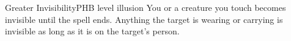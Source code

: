 \begin{spell}{Greater Invisibility}{PHB}{ level illusion}
{
}
You or a creature you touch becomes invisible until the spell ends. Anything
the target is wearing or carrying is invisible as long as it is on the target’s
person.
\end{spell}
